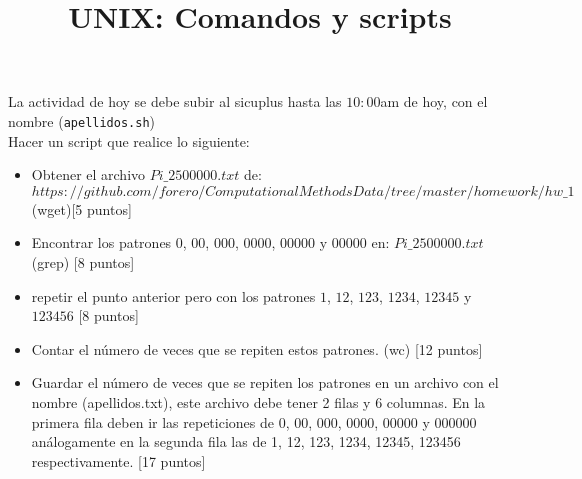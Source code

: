 \documentclass{article}
\title{UNIX: Comandos y scripts}
\begin{document}
\maketitle

La actividad de hoy se debe subir al \textrm{sicuplus} hasta las $10:00$am de hoy,
con el nombre (\texttt{apellidos.sh})\\
Hacer un script que realice lo siguiente:

\begin{itemize}

\item Obtener el archivo $Pi\_2500000.txt$ de: \\ $https://github.com/forero/ComputationalMethodsData/tree/master/homework/hw\_1$
(wget)[5 puntos]
\item  Encontrar los patrones $0$, $00$, $000$, $0000$, $00000$ y $00000$ en:
$Pi\_2500000.txt$  (grep) [8 puntos]
\item repetir el punto anterior pero con los patrones $1$, $12$, $123$, $1234$, $12345$ y $123456$ [8 puntos]
\item Contar el n\'umero de veces que se repiten estos patrones. (wc) [12 puntos]
\item Guardar el n\'umero de veces que se repiten los patrones en un archivo con el nombre (apellidos.txt), este archivo debe tener 2 filas y 6 columnas. En la primera fila deben ir las repeticiones de 0, 00, 000, 0000, 00000 y 000000 an\'alogamente en la segunda fila las de 1, 12, 123, 1234, 12345, 123456 respectivamente. [17 puntos]

\end{itemize}
\end{document}
